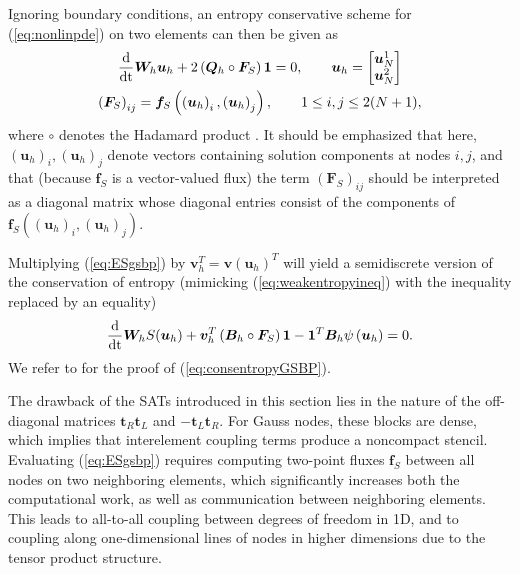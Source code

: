 \documentclass[review,onefignum,onetabnum,final]{siamart171218}
\newcommand{\td}[2]{\frac{{\rm d}#1}{{\rm d}{\rm #2}}}
\newcommand{\LRp}[1]{\left( #1 \right)}
\newcommand{\note}[1]{{\color{blue}{#1}}}
\begin{document}
Ignoring boundary conditions, an entropy conservative scheme for (\ref{eq:nonlinpde}) on two elements can then be given as
\begin{gather}
\td{}{t}\bm{W}_h\bm{u}_h + 2\LRp{\bm{Q}_h \circ \bm{F}_S}\bm{1} = 0, \qquad \bm{u}_h = \begin{bmatrix}
\bm{u}^1_N\\
\bm{u}^2_N
\end{bmatrix} \label{eq:ESgsbp} \\
\LRp{\bm{F}_S}_{ij} = \bm{f}_S\LRp{\LRp{\bm{u}_h}_i,\LRp{\bm{u}_h}_j}, \qquad 1 \leq  i,j \leq 2(N+1), \nonumber
\end{gather}
where $\circ$ denotes the Hadamard product \cite{horn2012matrix}.  {It should be emphasized that here, $(\bm{u}_h)_i, (\bm{u}_h)_j$ denote vectors containing solution components at nodes $i,j$, and that (because $\bm{f}_S$ is a vector-valued flux) the term $\LRp{\bm{F}_S}_{ij}$ should be interpreted as a diagonal matrix whose diagonal entries consist of the components of $\bm{f}_S\LRp{(\bm{u}_h)_i, (\bm{u}_h)_j}$.}

Multiplying (\ref{eq:ESgsbp}) by $\bm{v}_h^T = \bm{v}\LRp{\bm{u}_h}^T$ 
will yield a semidiscrete version of the conservation of entropy (mimicking (\ref{eq:weakentropyineq}) with the inequality replaced by an equality)
\begin{equation}
\label{eq:consentropyGSBP}
\td{}{t}\bm{W}_h S(\bm{u}_h) + \bm{v}_h^T\LRp{\bm{B}_h\circ \bm{F}_S}\bm{1} -\bm{1}^T\bm{B}_h\psi\LRp{\bm{u}_h} = 0.
\end{equation}
We refer to \cite{crean2017high, crean2018entropy} for the proof of (\ref{eq:consentropyGSBP}).  

The drawback of the SATs introduced in this section lies in the nature of the off-diagonal matrices $\bm{t}_R\bm{t}_L$ and $-\bm{t}_L\bm{t}_R$.  For Gauss nodes, these blocks are dense, which implies that interelement coupling terms produce a noncompact stencil.  Evaluating (\ref{eq:ESgsbp}) requires computing two-point fluxes $\bm{f}_S$ between all nodes on two neighboring elements, which significantly increases both the computational work, as well as communication between neighboring elements.  This leads to all-to-all coupling between degrees of freedom in 1D, and to coupling along one-dimensional lines of nodes in higher dimensions due to the tensor product structure.  
\end{document}
